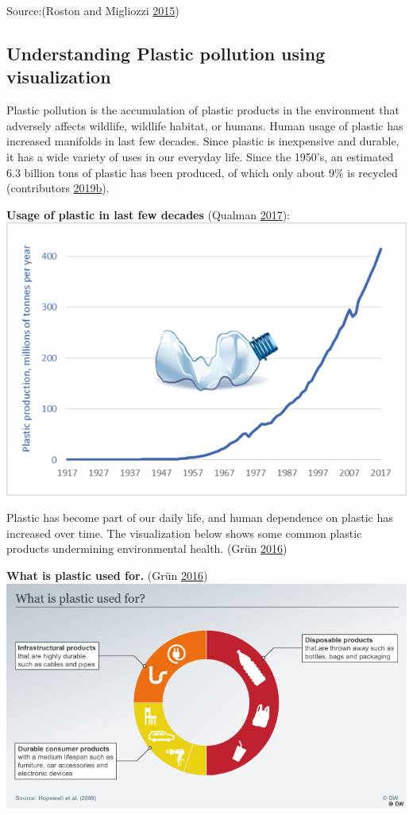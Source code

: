 \documentclass[]{book}
\begin{document}
Source:(Roston and Migliozzi \protect\hyperlink{ref-world_warming}{2015})

\hypertarget{understanding-plastic-pollution-using-visualization}{%
\subsection{Understanding Plastic pollution using visualization}\label{understanding-plastic-pollution-using-visualization}}

Plastic pollution is the accumulation of plastic products in the environment that adversely affects wildlife, wildlife habitat, or humans. Human usage of plastic has increased manifolds in last few decades. Since plastic is inexpensive and durable, it has a wide variety of uses in our everyday life. Since the 1950's, an estimated 6.3 billion tons of plastic has been produced, of which only about 9\% is recycled (contributors \protect\hyperlink{ref-wiki_plastic_pollution}{2019}\protect\hyperlink{ref-wiki_plastic_pollution}{b}).

\textbf{Usage of plastic in last few decades} (Qualman \protect\hyperlink{ref-global_plastic_production}{2017}):
\includegraphics{images/Global-plastic-production-1917-to-2017.png}

Plastic has become part of our daily life, and human dependence on plastic has increased over time. The visualization below shows some common plastic products undermining environmental health. (Grün \protect\hyperlink{ref-plastic_pollution_visualizations}{2016})

\textbf{What is plastic used for.} (Grün \protect\hyperlink{ref-plastic_pollution_visualizations}{2016})
\includegraphics{images/use_of_plastic.png}
\end{document}
